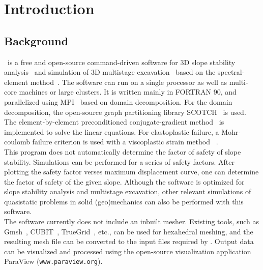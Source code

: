 
\chapter{Introduction}
\section{Background}

\pack\ is a free and open-source command-driven software for 3D slope stability analysis~\citep[for more details see][]{gharti2011} and simulation of 3D multistage excavation~\citep[for more details see][]{gharti2011b} based on the spectral-element method~\citep[e.g.,][]{patera1984,canuto1988,seriani1994,faccioli1997,komatitsch1998,komatitsch1999,peter2011}. The software can run on a single processor as well as multi-core machines or large clusters. It is written mainly in FORTRAN 90, and parallelized using
MPI~\citep{gropp1994,pacheco1997} based on domain decomposition. For the domain decomposition, the open-source graph partitioning library SCOTCH~\citep{pellegrini1996} is used. The element-by-element preconditioned conjugate-gradient method~\citep[e.g.,][]{hughes1983,law1986,king1987,barragy1988} is implemented to solve the linear equations. For elastoplastic failure,
a Mohr-coulomb failure criterion is used with a viscoplastic strain method~ \citep{zienkiewicz1974}.\\

This program does not automatically determine the factor of safety of slope stability. Simulations can be performed for a series of safety factors. After plotting the safety factor verses maximum displacement curve, one can determine the factor of safety of the given slope. Although the software is optimized for slope stability analysis and multistage excavation, other relevant simulations of quasistatic problems in solid (geo)mechanics can also be performed with this software.\\

The software currently does not include an inbuilt mesher. Existing tools, such as Gmsh~\citep{geuzaine2009}, CUBIT~\citep{cubit2011}, TrueGrid~\citep{truegrid2006}, etc., can be used for hexahedral meshing, and the resulting mesh file can be converted to the input files required by \pack. Output data can be visualized and processed using the open-source visualization application ParaView (\texttt{www.paraview.org}).

